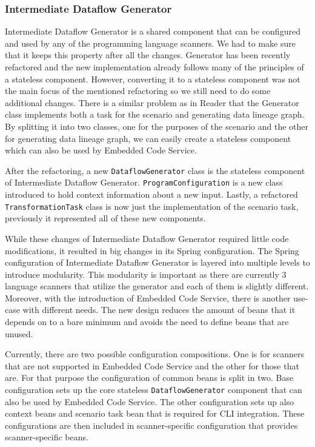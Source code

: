 \subsubsection{Intermediate Dataflow Generator}
Intermediate Dataflow Generator is a shared component that can be configured and used by any of the programming language scanners. We had to make sure that it keeps this property after all the changes. Generator has been recently refactored and the new implementation already follows many of the principles of a stateless component. However, converting it to a stateless component was not the main focus of the mentioned refactoring so we still need to do some additional changes. There is a similar problem as in Reader that the Generator class implements both a task for the scenario and generating data lineage graph. By splitting it into two classes, one for the purposes of the scenario and the other for generating data lineage graph, we can easily create a stateless component which can also be used by Embedded Code Service.
\par
After the refactoring, a new \texttt{DataflowGenerator} class is the stateless component of Intermediate Dataflow Generator. \texttt{ProgramConfiguration} is a new class introduced to hold context information about a new input. Lastly, a refactored \texttt{TransformationTask} class is now just the implementation of the scenario task, previously it represented all of these new components.
\par
While these changes of Intermediate Dataflow Generator required little code modifications, it resulted in big changes in its Spring configuration. The Spring configuration of Intermediate Dataflow Generator is layered into multiple levels to introduce modularity. This modularity is important as there are currently 3 language scanners that utilize the generator and each of them is slightly different. Moreover, with the introduction of Embedded Code Service, there is another use-case with different needs. The new design reduces the amount of beans that it depends on to a bare minimum and avoids the need to define beans that are unused.
\par
Currently, there are two possible configuration compositions. One is for scanners that are not supported in Embedded Code Service and the other for those that are. For that purpose the configuration of common beans is split in two. Base configuration sets up the core stateless \texttt{DataflowGenerator} component that can also be used by Embedded Code Service. The other configuration sets up also context beans and scenario task bean that is required for CLI integration. These configurations are then included in scanner-specific configuration that provides scanner-specific beans.
